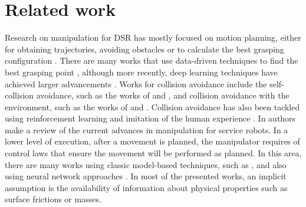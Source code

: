 \documentclass[conference,letterpaper]{ieeeconf}
\begin{document}
\section{Related work}
\label{sec:RelatedWork}

Research on manipulation for DSR has mostly focused on motion planning, either for obtaining trajectories, avoiding obstacles or to calculate the best grasping configuration \cite{billard_trends_2019}. There are many works that use data-driven techniques to find the best grasping point \cite{bohg2013data,sahbani2012overview}, although more recently, deep learning techniques have achieved larger advancements \cite{nguyen_review_2019}. Works for collision avoidance include the self-collision avoidance, such as the works of \cite{mirrazavi2018unified} and \cite{rakita2018relaxedik}, and collision avoidance with the environment, such as the works of \cite{di2017real} and \cite{nikou2017nonlinear}. Collision avoidance has also been tackled using reinforcement learning \cite{yamada2020motion} and imitation of the human experience \cite{huang2020real}. In \cite{hamidreza2020state} authors make a review of the current advances in manipulation for service robots. In a lower level of execution, after a movement is planned, the manipulator requires of control laws that ensure the movement will be performed as planned. In this area, there are many works using classic model-based techniques, such as \cite{varela2018modelling,han2017assumed}, and also using neural network approaches \cite{jin2018robot}. In most of the presented works, an implicit assumption is the availability of information about physical properties such as surface frictions or masses. 
\end{document}
